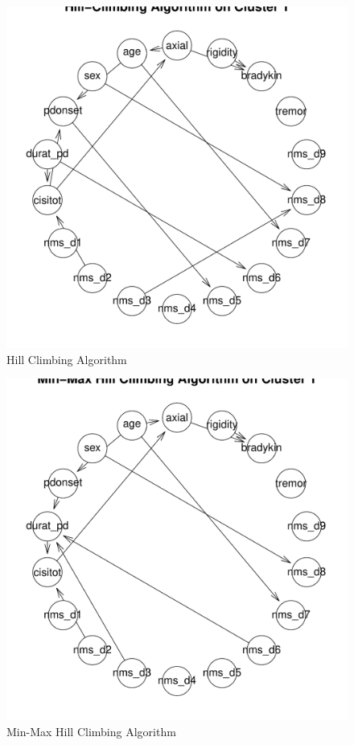 \documentclass[letterpaper,12pt]{article}
\begin{document}
\begin{figure}[h]
  \centering
  \includegraphics[width=0.8\linewidth]{clus1-bnet-hc.pdf}
  \caption{Hill Climbing Algorithm}
  \label{fig:bnet-hc}
\end{figure}

\begin{figure}[h]
  \centering
  \includegraphics[width=0.8\linewidth]{clus1-bnet-mmhc.pdf}
  \caption{Min-Max Hill Climbing Algorithm}
  \label{fig:bnet-mmhc}
\end{figure}
\end{document}
